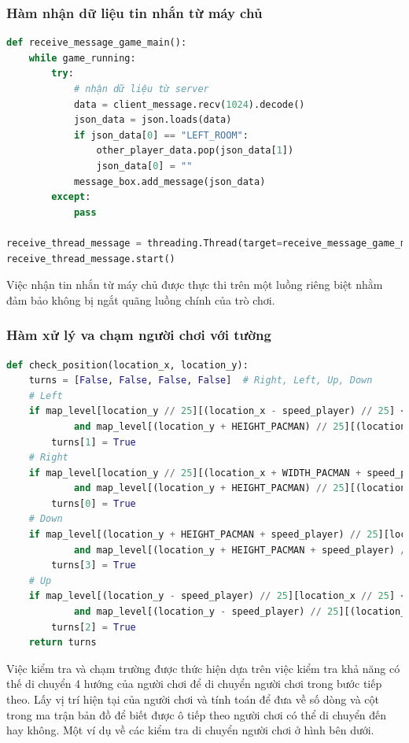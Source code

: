 \documentclass[a4paper]{article}
\begin{document}
\subsubsection{Hàm nhận dữ liệu tin nhắn từ máy chủ}
\begin{lstlisting}[language=Python]
def receive_message_game_main():
    while game_running:
        try:
            # nhận dữ liệu từ server
            data = client_message.recv(1024).decode()
            json_data = json.loads(data)
            if json_data[0] == "LEFT_ROOM":
                other_player_data.pop(json_data[1])
                json_data[0] = ""
            message_box.add_message(json_data)
        except:
            pass

receive_thread_message = threading.Thread(target=receive_message_game_main)
receive_thread_message.start()
\end{lstlisting}
Việc nhận tin nhắn từ máy chủ được thực thi trên một luồng riêng biệt nhằm đảm bảo không bị ngắt quãng luồng chính của trò chơi.


\newpage
\subsubsection{Hàm xử lý va chạm người chơi với tường}
\begin{lstlisting}[language=Python]
def check_position(location_x, location_y):
    turns = [False, False, False, False]  # Right, Left, Up, Down
    # Left
    if map_level[location_y // 25][(location_x - speed_player) // 25] < 3 \
            and map_level[(location_y + HEIGHT_PACMAN) // 25][(location_x - speed_player) // 25] < 3:
        turns[1] = True
    # Right
    if map_level[location_y // 25][(location_x + WIDTH_PACMAN + speed_player) // 25] < 3 \
            and map_level[(location_y + HEIGHT_PACMAN) // 25][(location_x + WIDTH_PACMAN) // 25] < 3:
        turns[0] = True
    # Down
    if map_level[(location_y + HEIGHT_PACMAN + speed_player) // 25][location_x // 25] < 3 \
            and map_level[(location_y + HEIGHT_PACMAN + speed_player) // 25][(location_x + WIDTH_PACMAN) // 25] < 3:
        turns[3] = True
    # Up
    if map_level[(location_y - speed_player) // 25][location_x // 25] < 3 \
            and map_level[(location_y - speed_player) // 25][(location_x + WIDTH_PACMAN) // 25] < 3:
        turns[2] = True
    return turns
\end{lstlisting}
Việc kiểm tra và chạm trường được thức hiện dựa trên việc kiểm tra khả năng có thế di chuyển 4 hướng của người chơi để di chuyển người chơi trong bước tiếp theo. Lấy vị trí hiện tại của người chơi và tính toán để đưa về số dòng và cột trong ma trận bản đồ để biết được ô tiếp theo người chơi có thể di chuyển đến hay không. Một ví dụ về các kiểm tra di chuyển người chơi ở hình bên dưới.
\end{document}
